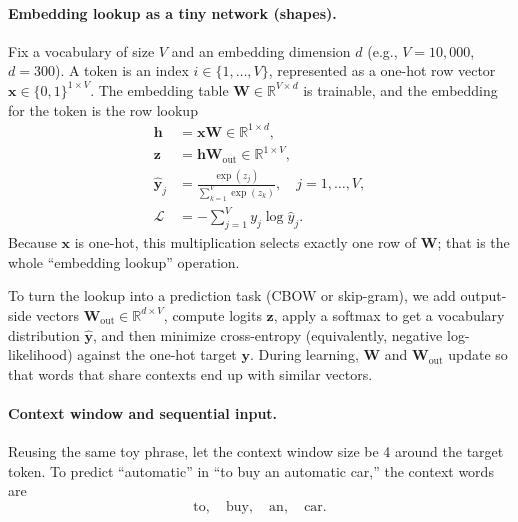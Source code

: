 
\paragraph{Embedding lookup as a tiny network (shapes).}
\label{sec:nlp_neural_network_architecture_for_word_embeddings}
Fix a vocabulary of size \(V\) and an embedding dimension \(d\) (e.g., \(V=10{,}000\), \(d=300\)). A token is an index \(i\in\{1,\ldots,V\}\), represented as a one-hot row vector \(\mathbf{x}\in\{0,1\}^{1\times V}\). The embedding table \(\mathbf{W}\in\mathbb{R}^{V\times d}\) is trainable, and the embedding for the token is the row lookup
\begin{equation}
    \begin{aligned}
        \mathbf{h} &= \mathbf{x}\mathbf{W}\in\mathbb{R}^{1\times d},\\
        \mathbf{z} &= \mathbf{h}\mathbf{W}_{\text{out}} \in \mathbb{R}^{1\times V},\\
        \hat{\mathbf{y}}_j &= \frac{\exp(z_j)}{\sum_{k=1}^V \exp(z_k)}, \quad j=1,\ldots, V,\\
        \mathcal{L} &= - \sum_{j=1}^V y_j \log \hat{y}_j.
    \end{aligned}
    \label{eq:hidden_layer}
\end{equation}
Because \(\mathbf{x}\) is one-hot, this multiplication selects exactly one row of \(\mathbf{W}\); that is the whole ``embedding lookup'' operation.

To turn the lookup into a prediction task (CBOW or skip-gram), we add output-side vectors \(\mathbf{W}_{\text{out}}\in\mathbb{R}^{d\times V}\), compute logits \(\mathbf{z}\), apply a softmax to get a vocabulary distribution \(\hat{\mathbf{y}}\), and then minimize cross\hyp{}entropy (equivalently, negative log-likelihood) against the one-hot target \(\mathbf{y}\).
During learning, \(\mathbf{W}\) and \(\mathbf{W}_{\text{out}}\) update so that words that share contexts end up with similar vectors.

\paragraph{Context window and sequential input.}
\label{sec:nlp_context_window_and_sequential_input}

Reusing the same toy phrase, let the context window size be 4 around the target token. To predict ``automatic'' in ``to buy an automatic car,'' the context words are
\[
\text{to}, \quad \text{buy}, \quad \text{an}, \quad \text{car}.
\]

